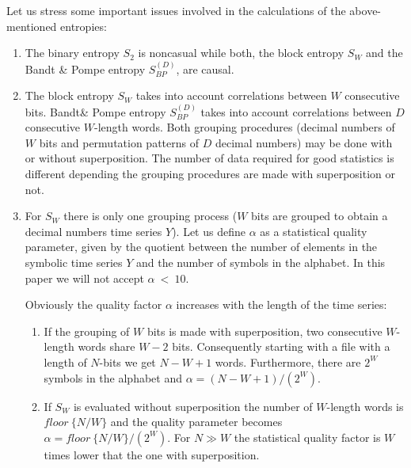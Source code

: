 Let us stress some important issues involved in the calculations of the above-mentioned entropies:
\begin{enumerate}
\item The binary entropy $S_2$ is noncasual while both, the block entropy $S_W$ and the Bandt \& Pompe entropy $S^{(D)}_{BP}$, are causal. 
\item The block entropy $S_W$ takes into account correlations between $W$ consecutive bits. Bandt\& Pompe entropy $S^{(D)}_{BP}$ takes into account correlations between $D$ consecutive $W$-length words.
Both grouping procedures (decimal numbers of $W$ bits and permutation patterns of $D$ decimal numbers) may be done with or without superposition. The number of data required for good statistics is different depending the grouping procedures are made with superposition or not.
\item For $S_W$ there is only one grouping process ($W$ bits are grouped to obtain a decimal numbers time series $Y$). Let us define $\alpha$ as a statistical quality parameter, given by the quotient between the number of elements in the symbolic time series $Y$ and the number of symbols in the alphabet. In this paper we will not accept $\alpha~<~10$. 

Obviously the quality factor $\alpha$ increases with the length of the time series:
%
\begin{enumerate}
\item If the grouping of $W$ bits is made with superposition, two consecutive $W$-length words share $W-2$ bits. Consequently starting with a file with a length of $N$-bits we get $N-W+1$ words. Furthermore, there are $2^W$ symbols in the alphabet and $\alpha=(N-W+1)/(2^W)$. 
\item If $S_W$ is evaluated without superposition the number of $W$-length words is $floor~\{N/W\}$ and the quality parameter becomes $\alpha=floor~\{N/W\}/(2^W)$. For $N\gg W$ the statistical quality factor is $W$ times lower that the one with superposition.
\end{enumerate}


\end{enumerate}
